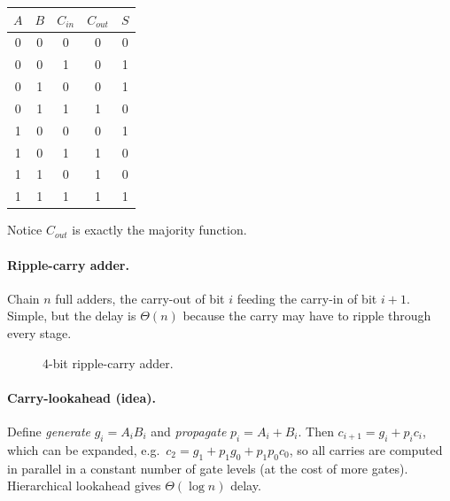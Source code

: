 \begin{center}
\begin{tabular}{ccc|cc}
\toprule
$A$ & $B$ & $C_{in}$ & $C_{out}$ & $S$ \\
\midrule
0&0&0&0&0\\ 0&0&1&0&1\\ 0&1&0&0&1\\ 0&1&1&1&0\\
1&0&0&0&1\\ 1&0&1&1&0\\ 1&1&0&1&0\\ 1&1&1&1&1\\
\bottomrule
\end{tabular}
\end{center}

Notice $C_{out}$ is exactly the majority function.

\paragraph{Ripple-carry adder.} Chain $n$ full adders, the carry-out of bit
$i$ feeding the carry-in of bit $i+1$. Simple, but the delay is $\Theta(n)$
because the carry may have to ripple through every stage.

\begin{figure}[H]
\centering
{}
\caption{4-bit ripple-carry adder.}
\end{figure}

\paragraph{Carry-lookahead (idea).} Define \emph{generate} $g_i = A_iB_i$
and \emph{propagate} $p_i = A_i + B_i$. Then $c_{i+1} = g_i + p_ic_i$, which
can be expanded, e.g.\ $c_2 = g_1 + p_1g_0 + p_1p_0c_0$, so all carries are
computed in parallel in a constant number of gate levels (at the cost of
more gates). Hierarchical lookahead gives $\Theta(\log n)$ delay.

